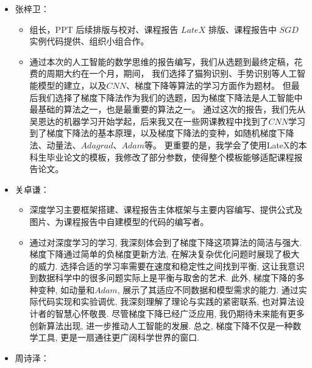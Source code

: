 \documentclass[printMode=true, declarePage=false]{ecnuthesis}
\begin{document}
    \begin{acknowledgement}
        \begin{itemize}
            \item 张梓卫：

            \begin{itemize}
                \item 组长，PPT 后续排版与校对、课程报告 $LateX$ 排版、课程报告中 $SGD$ 实例代码提供、组织小组合作。
                \item 通过本次的人工智能的数学思维的报告编写，我们从选题到最终定稿，花费的周期大约在一个月，期间，
                我们选择了猫狗识别、手势识别等人工智能模型的建立，以及$CNN$、梯度下降等算法的学习方面作为题材。
                但最后我们选择了梯度下降法作为我们的选题，因为梯度下降法是人工智能中最基础的算法之一，也是最重要的算法之一。
                通过这次的报告，我们先从吴恩达的机器学习开始学起，后来我又在一些网课教程中找到了$CNN$学习到了梯度下降法的基本原理，以及梯度下降法的变种，如随机梯度下降法、动量法、$Adagrad$、$Adam$等。
                更重要的是，我学会了使用LateX的本科生毕业论文的模板，我修改了部分参数，使得整个模板能够适配课程报告论文。
            \end{itemize}

            \item 关卓谦：

            \begin{itemize}
                \item 深度学习主要框架搭建、课程报告主体框架与主要内容编写、提供公式及图片、为课程报告中自建模型的代码的编写者。
                \item 通过对深度学习的学习, 我深刻体会到了梯度下降这项算法的简洁与强大.
                梯度下降通过简单的负梯度更新方法, 在解决复杂优化问题时展现了极大的威力.
                选择合适的学习率需要在速度和稳定性之间找到平衡, 这让我意识到数据科学中的很多问题实际上是平衡与取舍的艺术.
                此外, 梯度下降的多种变种, 如动量和$Adam$, 展示了其适应不同数据和模型需求的能力.
                通过实际代码实现和实验调优, 我深刻理解了理论与实践的紧密联系, 也对算法设计者的智慧心怀敬畏.
                尽管梯度下降已经广泛应用, 我仍期待未来能有更多创新算法出现, 进一步推动人工智能的发展.
                总之, 梯度下降不仅是一种数学工具, 更是一扇通往更广阔科学世界的窗口.
            \end{itemize}

            \item 周诗泽：


\end{itemize}
\end{acknowledgement}
\end{document}
